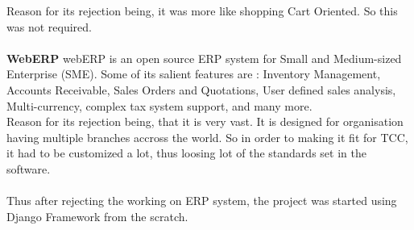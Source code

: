 Reason for its rejection being, it was more like shopping Cart Oriented. So this was not required.\\\\
{\bf WebERP} webERP is an open source ERP system for Small and Medium-sized Enterprise (SME). Some of its salient features are : Inventory Management, Accounts Receivable, Sales Orders and Quotations, User defined sales analysis, Multi-currency, complex tax system support, and many more.\\
Reason for its rejection being, that it is very vast. It is designed for organisation having multiple branches accross the world. So in order to making it fit for TCC, it had to be customized a lot, thus loosing lot of the standards set in the software.\\\\
Thus after rejecting the working on ERP system, the project was started using Django Framework from the scratch.\\
\newpage

